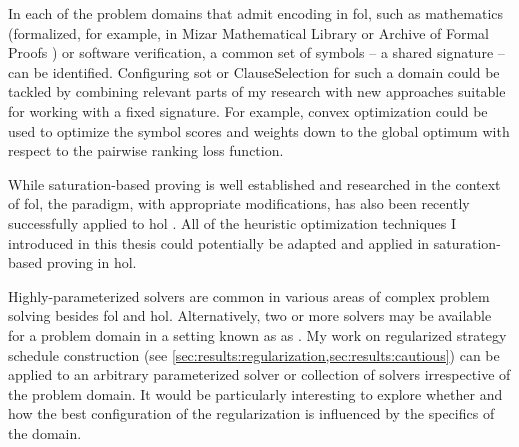 In each of the problem domains that admit encoding in \gls{fol},
such as mathematics (formalized, for example, in Mizar Mathematical Library \cite{DBLP:journals/jfrea/GrabowskiKN10,DBLP:journals/jar/Urban06} or Archive of Formal Proofs \cite{DBLP:conf/mkm/BlanchetteHMN15,DBLP:conf/itp/DesharnaisVBW22}) or software verification,
a common set of symbols -- a shared signature -- can be identified.
Configuring \gls{sot} or \gls{ClauseSelection}
for such a domain could be tackled by combining relevant parts of my research with new approaches suitable for working with a fixed signature.
For example, convex optimization could be used to optimize the symbol scores and weights down to the global optimum with respect to the pairwise ranking loss function.

While saturation-based proving is well established and researched in the context of \gls{fol},
the paradigm, with appropriate modifications, has also been recently successfully applied to \gls{hol} \cite{DBLP:journals/ki/Steen20,DBLP:journals/jar/VukmirovicBBCNT22,DBLP:conf/ijcar/BhayatS24}.
All of the heuristic optimization techniques I introduced in this thesis could potentially be adapted and applied in saturation-based proving in \gls{hol}.

Highly-parameterized solvers are common in various areas of complex problem solving besides \gls{fol} and \gls{hol}.
Alternatively, two or more solvers may be available for a problem domain in a setting known as \gls{as} \cite{DBLP:journals/ai/BischlKKLMFHHLT16}.
My work on regularized strategy schedule construction (see \cref{sec:results:regularization,sec:results:cautious}) can be applied to an arbitrary parameterized solver or collection of solvers irrespective of the problem domain.
It would be particularly interesting to explore whether and how the best configuration of the regularization is influenced by the specifics of the domain.

